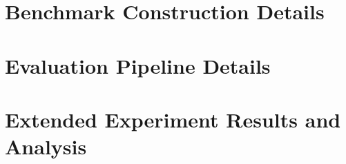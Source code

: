 \clearpage
\begingroup
\hypersetup{linkcolor=black}
\renewcommand{\contentsname}{Appendix Table of Contents}
\setcounter{tocdepth}{2}
\localtableofcontents
\endgroup
\newpage



\section{Benchmark Construction Details}
\label{app:benchmark-construction}





\section{Evaluation Pipeline Details}
\label{app:evaluation-pipeline}






\section{Extended Experiment Results and Analysis}
\label{app:extended-results}








